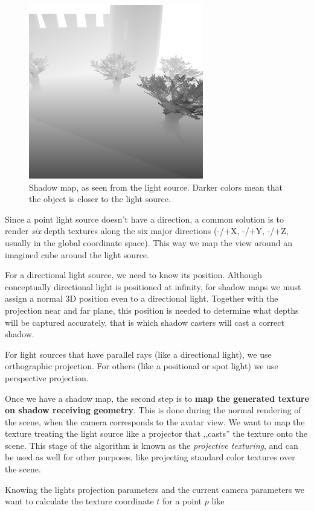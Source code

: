 \documentclass{acmsiggraph}                     %
\begin{document}
\begin{figure}[H]
  \centering
  \includegraphics[width=3in]{depths_light_mapped}
  \caption{Shadow map, as seen from the light source. Darker colors mean that the object is closer to the light source.}
\end{figure}

Since a point light source doesn't have a direction, a common solution
is to render \emph{six} depth textures along the six major directions
(-/+X, -/+Y, -/+Z, usually in the global coordinate space). This way we map
the view around an imagined cube around the light source.

For a directional light source, we need to know its position.
Although conceptually directional light is positioned at infinity,
for shadow maps we must assign a normal 3D position even to a directional light.
Together with the projection near and far plane, this position is needed to determine
what depths will be captured accurately, that is which shadow casters
will cast a correct shadow.

For light sources that have parallel rays (like a directional light),
we use orthographic projection. For others (like a positional or spot light)
we use perspective projection.

Once we have a shadow map, the second step is to
\textbf{map the generated texture on shadow receiving geometry}.
This is done during the normal rendering of the scene, when the camera
corresponds to the avatar view. We want to map the texture treating
the light source like a projector that ,,casts'' the texture onto the scene.
This stage of the algorithm is known as the \emph{projective texturing},
and can be used as well for other purposes, like projecting standard color
textures over the scene.

Knowing the lights projection parameters and the current
camera parameters we want to calculate the texture coordinate $t$
for a point $p$ like
\end{document}
